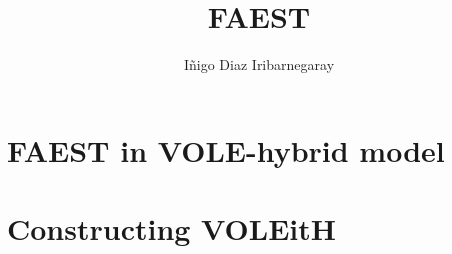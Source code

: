 \documentclass{beamer}
\title{FAEST}
\author[Iñigo D.I.]{Iñigo Diaz Iribarnegaray}
\begin{document}
  \frame{\titlepage}
  
  \section{FAEST in VOLE-hybrid model}
  
  
  
  

  \section{Constructing VOLEitH}
  
  
  
  
\end{document}
